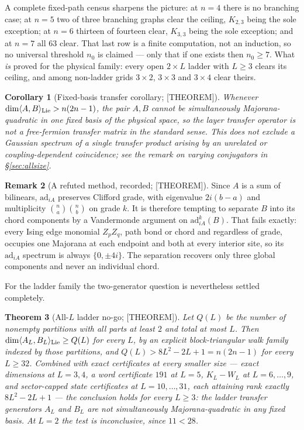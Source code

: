 \documentclass[11pt]{article}
\newtheorem{theorem}{Theorem}[section]
\newtheorem{corollary}[theorem]{Corollary}
\theoremstyle{definition}
\newtheorem{remark}[theorem]{Remark}
\begin{document}
A complete fixed-path census sharpens the picture: at $n=4$ there is no branching case; at $n=5$
two of three branching graphs clear the ceiling, $K_{2,3}$ being the sole exception; at $n=6$
thirteen of fourteen clear, $K_{3,3}$ being the sole exception; and at $n=7$ all $63$ clear. That last
row is a finite computation, not an induction, so no universal threshold $n_0$ is claimed --- only
that if one exists then $n_0\ge7$. What \emph{is} proved for the physical family: every open
$2\times L$ ladder with $L\ge3$ clears its ceiling, and among non-ladder grids $3\times2$,
$3\times3$ and $3\times4$ clear theirs.

\begin{corollary}[Fixed-basis transfer corollary; {[THEOREM]}]
Whenever $\dim\langle A,B\rangle_{\rm Lie}>n(2n-1)$, the pair $A,B$ cannot be simultaneously
Majorana-quadratic in one fixed basis of the physical space, so the layer transfer operator is not a
free-fermion transfer matrix in the standard sense. This does \emph{not} exclude a Gaussian spectrum
of a single transfer product arising by an unrelated or coupling-dependent coincidence; see the
remark on varying conjugators in \S\ref{sec:allsize}.
\end{corollary}

\begin{remark}[A refuted method, recorded; {[THEOREM]}]
Since $A$ is a sum of bilinears, $\mathrm{ad}_{iA}$ preserves Clifford grade, with eigenvalue
$2i(b-a)$ and multiplicity $\binom na\binom nb$ on grade $k$. It is therefore tempting to separate
$B$ into its chord components by a Vandermonde argument on $\mathrm{ad}_{iA}^k(B)$. That fails
exactly: every Ising edge monomial $Z_pZ_q$, path bond or chord and regardless of grade, occupies one
Majorana at each endpoint and both at every interior site, so its $\mathrm{ad}_{iA}$ spectrum is
always $\{0,\pm4i\}$. The separation recovers only three global components and never an individual
chord.
\end{remark}

For the ladder family the two-generator question is nevertheless settled completely.

\begin{theorem}[All-$L$ ladder no-go; {[THEOREM]}]\label{thm:ladderallL}
Let $Q(L)$ be the number of nonempty partitions with all parts at least $2$ and total at most $L$.
Then $\dim\langle A_L,B_L\rangle_{\rm Lie}\ge Q(L)$ for every $L$, by an explicit block-triangular
walk family indexed by those partitions, and $Q(L)>8L^2-2L+1=n(2n-1)$ for every $L\ge32$. Combined
with exact certificates at every smaller size --- exact dimensions at $L=3,4$, a word certificate
$191$ at $L=5$, $K_L-W_L$ at $L=6,\dots,9$, and sector-capped state certificates at
$L=10,\dots,31$, each attaining rank exactly $8L^2-2L+1$ --- the conclusion holds for every $L\ge3$:
the ladder transfer generators $A_L$ and $B_L$ are not simultaneously Majorana-quadratic in any fixed
basis. At $L=2$ the test is inconclusive, since $11<28$.
\end{theorem}
\end{document}
